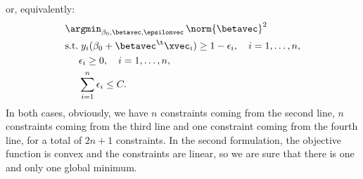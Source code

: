 or, equivalently:
\begin{equation}
    \begin{aligned}
         & \argmin_{\beta_0, \betavec, \epsilonvec}\,\norm{\betavec}^2                                  \\
         & \text{s.t.}\; y_i(\beta_0 + \betavec^\t\xvec_i) \geq 1 - \epsilon_i, \quad i = 1, \dots, n, \\
         & \phantom{s.t.} \epsilon_i \geq 0, \quad i = 1, \dots, n,                                    \\
         & \phantom{s.t.} \sum_{i=1}^n \epsilon_i \leq C.
    \end{aligned}
\end{equation}
In both cases, obviously, we have $n$ constraints coming from the second line, $n$ constraints coming from the third line and one constraint coming from the fourth line, for a total of $2n + 1$ constraints. In the second formulation, the objective function is convex and the constraints are linear, so we are sure that there is one and only one global minimum.

